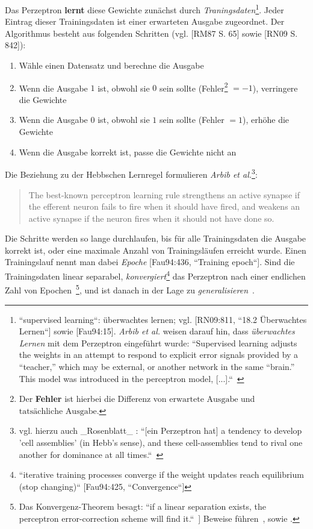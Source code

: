 Das Perzeptron \textbf{lernt} diese Gewichte zunächst durch \textit{Traningsdaten}\footnote{
    ``supervised learning``: überwachtes lernen; vgl. [RN09:811, ``18.2 Überwachtes Lernen``] sowie [Fau94:15]. \textit{Arbib et al.} weisen darauf hin, dass \textit{überwachtes Lernen} mit dem Perzeptron eingeführt wurde: ``Supervised learning adjusts the weights in an attempt to respond to explicit error signals provided by a “teacher,” which may be external, or another network in the same “brain.” This model was introduced in the perceptron model, [...].``~\cite[30]{Arb03}
}.
Jeder Eintrag dieser Trainingsdaten ist einer erwarteten Ausgabe zugeordnet. Der Algorithmus besteht aus folgenden Schritten (vgl. [RM87 S. 65] sowie [RN09 S. 842]):



\begin{enumerate}
    \item Wähle einen Datensatz und berechne die Ausgabe
    \item Wenn die Ausgabe $1$ ist, obwohl sie $0$ sein sollte (Fehler\footnote{
    Der \textbf{Fehler} ist hierbei die Differenz von $\text{erwartete Ausgabe}$ und $\text{tatsächliche Ausgabe}$.
    } $=-1$), verringere die Gewichte
    \item Wenn die Ausgabe $0$ ist, obwohl sie $1$ sein sollte  (Fehler $=1$), erhöhe die Gewichte
    \item Wenn die Ausgabe korrekt ist, passe die Gewichte nicht an
\end{enumerate}

\noindent
Die Beziehung zu der Hebbschen Lernregel formulieren \textit{Arbib et al.}\footnote{
    vgl. hierzu auch _Rosenblatt_ : ``[ein Perzeptron hat] a tendency to develop 'cell assemblies' (in Hebb's sense), and these cell-assemblies tend to rival one another for dominance at all times.``~\cite[464]{Ros62}
}:

\blockquote[{\cite[20]{Arb03}}]{
    The best-known perceptron learning rule strengthens an active synapse if the efferent neuron fails to fire when it should have fired, and weakens an active synapse if the neuron fires when it should not have done so.
}

\noindent
Die Schritte werden so lange durchlaufen, bis für alle Trainingsdaten die Ausgabe korrekt ist, oder eine maximale Anzahl von Trainingsläufen erreicht wurde.
Einen Trainingslauf nennt man dabei \textit{Epoche} [Fau94:436, ``Training epoch``].
Sind die Trainingsdaten linear separabel, \textit{konvergiert}\footnote{
    ``iterative training processes converge if the weight updates reach equilibrium (stop changing)`` [Fau94:425, ``Convergence``]
} das Perzeptron nach einer endlichen Zahl von Epochen~\cite[164]{MP88}\footnote{
    Das Konvergenz-Theorem besagt: ``if a linear separation exists, the perceptron error-correction scheme will find it.``~\cite[20]{Arb03}] Beweise führen~\cite[111 ff.]{Ros62}, \cite[168 ff.]{MP88} sowie \cite{Nov62}.
}, und ist danach in der Lage zu \textit{generalisieren}~\cite[202]{Ert21a}.\\

